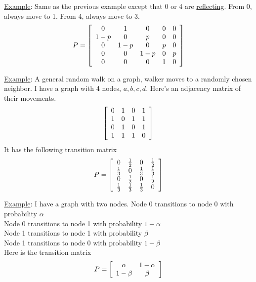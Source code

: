     \noindent\underline{Example}: Same as the previous example except that 0 or
    4 are \underline{reflecting}. From 0, always move to 1. From 4, always move 
    to 3.
    $$
        P = \left[
        \begin{array}{c c c c c} 
          0 & 1 & 0 & 0 & 0 \\
          1 - p & 0 & p & 0 & 0\\
          0 & 1 - p & 0 & p & 0\\
          0 & 0 & 1-p & 0 & p\\
          0 & 0 & 0 & 1 & 0
        \end{array}
      \right]
      $$

    \noindent\underline{Example}: A general random walk on a graph, 
      walker moves to a randomly chosen neighbor. I have a graph with
      4 nodes, $a, b, c, d$. Here's an adjacency matrix of their movements.
      $$
      \left[
        \begin{array}{c c c c} 
          0 & 1 & 0 & 1\\
          1 & 0 & 1 & 1\\
          0 & 1 & 0 & 1 \\
          1 & 1 & 1 & 0 
        \end{array}
      \right]
      $$
      It has the following transition matrix
      $$
      P = \left[
        \begin{array}{c c c c} 
          0 & \frac{1}{2} & 0 & \frac{1}{2}\\
          \frac{1}{3} & 0 & \frac{1}{3} & \frac{1}{3}\\
          0 & \frac{1}{2} & 0 & \frac{1}{2} \\
          \frac{1}{3} & \frac{1}{3} & \frac{1}{3} & 0 
        \end{array}
      \right]
      $$

    \noindent\underline{Example}: I have a graph with two nodes.
      Node 0 transitions to node 0 with probability $\alpha$\\
      Node 0 transitions to node 1 with probability $1-\alpha$\\
      Node 1 transitions to node 1 with probability $\beta$\\
      Node 1 transitions to node 0 with probability $1 - \beta$\\
      Here is the transition matrix
      $$
        P = \left[ 
          \begin{array}{c c} 
            \alpha & 1 - \alpha\\
            1 - \beta & \beta\\
          \end{array}
        \right]
      $$

